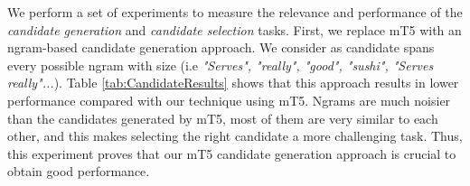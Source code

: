 \documentclass[11pt]{article}
\begin{document}
\begin{table}[htb]
    \centering
\caption{F1 scores for different candidate generation and candidate selection
methods.}
\label{tab:CandidateResults}
\end{table}


We perform a set of experiments to measure the relevance and performance of the
\emph{candidate generation} and \emph{candidate selection} tasks.  First, we replace mT5 with
an ngram-based candidate generation approach. We consider as candidate spans
every possible ngram with size  (i.e \textit{"Serves",
"really", "good", "sushi", "Serves really"...}). Table
\ref{tab:CandidateResults} shows that this approach results in lower
performance compared with our technique using mT5. Ngrams are
much noisier than the candidates generated by mT5, most of them 
are very similar to each other, and this makes selecting the right candidate a more challenging task. Thus, this experiment proves that our mT5 candidate
generation approach is crucial to obtain good performance.
\end{document}
